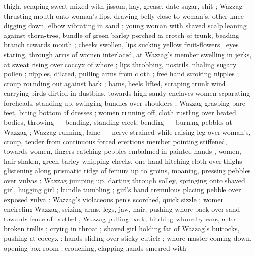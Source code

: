 thigh, scraping sweat mixed with jissom, hay, grease, date-sugar, shit ; Wazzag thrusting mouth onto woman's lips, drawing belly close to woman's, other knee digging down, elbow vibrating in sand ; young woman with shaved scalp leaning against thorn-tree, bundle of green barley perched in crotch of trunk, bending branch towards mouth ; cheeks swollen, lips sucking yellow fruit-flowers ; eyes staring, through arms of women interlaced, at Wazzag's member swelling in jerks, at sweat rising over coccyx of whore ; lips throbbing, nostrils inhaling sugary pollen ; nipples, dilated, pulling arms from cloth ; free hand stroking nipples ; croup rounding out against bark ; hams, heels lifted, scraping trunk {\dubsemi} wind carrying birds dirtied in dustbins, towards high sandy enclaves {\dubsemi} women separating foreheads, standing up, swinging bundles over shoulders ; Wazzag grasping bare feet, biting bottom of dresses ; women running off, cloth rustling over heated bodies, throwing --- bending, standing erect, bending --- burning pebbles at Wazzag ; Wazzag running, lame --- nerve strained while raising leg over woman's, croup, tender from continuous forced erections {\dashcom} member pointing stiffened, towards women, fingers catching pebbles embalmed in painted hands{\thd} , women, hair shaken, green barley whipping cheeks, one hand hitching cloth over thighs glistening along prismatic ridge of femurs up to groins, moaning, pressing pebbles over vulvas ; Wazzag jumping up, darting through volley, springing onto shaved girl, hugging girl ; bundle tumbling ; girl's hand tremulous placing pebble over exposed vulva : Wazzag's violaceous penis scorched, quick sizzle ; women encircling Wazzag, seizing arms, legs, jaw, hair, pushing whore back over sand towards fence of brothel ; Wazzag pulling back, hitching whore by ears, onto broken trellis ; crying in throat ; shaved girl holding fat of Wazzag's buttocks, pushing at coccyx  ; hands sliding over sticky cuticle ; whore-master coming down, opening box-room : crouching, clapping hands smeared with 
